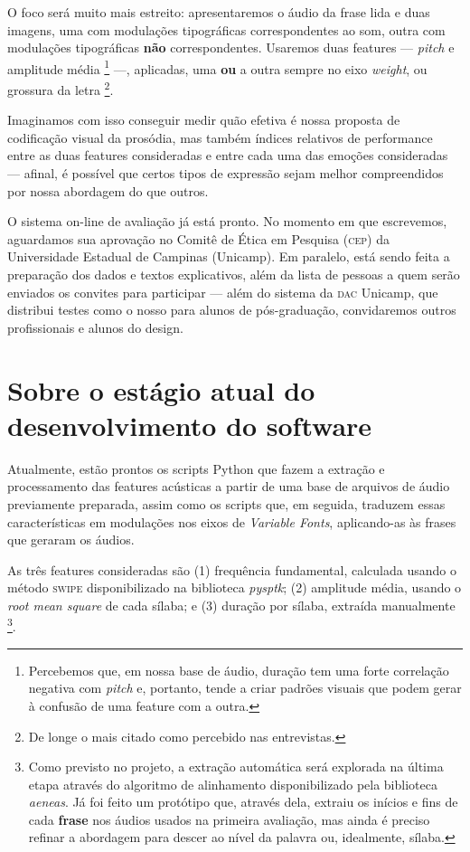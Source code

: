 \documentclass[a4paper,11pt,titlepage,singlespacing]{article}
\let\svthefootnote\thefootnote
\newcommand\Cfootnote[2][black]{\def\thefootnote{\color{#1}\svthefootnote}%
  \footnote{\color{#1}#2}}
\begin{document}
{    O foco será muito mais estreito: apresentaremos o áudio da frase lida e duas imagens, uma com modulações tipográficas correspondentes ao som, outra com modulações tipográficas \textbf{não} correspondentes. Usaremos duas features — \textit{pitch} e amplitude média\Cfootnote[pos_parecer]{Percebemos que, em nossa base de áudio, duração tem uma forte correlação negativa com \textit{pitch} e, portanto, tende a criar padrões visuais que podem gerar à confusão de uma feature com a outra.} —, aplicadas, uma \textbf{ou} a outra sempre no eixo \textit{weight}, ou grossura da letra\Cfootnote[pos_parecer]{De longe o mais citado como percebido nas entrevistas.}. 
    
    Imaginamos com isso conseguir medir quão efetiva é nossa proposta de codificação visual da prosódia, mas também índices relativos de performance entre as duas features consideradas e entre cada uma das emoções consideradas — afinal, é possível que certos tipos de expressão sejam melhor compreendidos por nossa abordagem do que outros.
    
    O sistema on-line de avaliação já está pronto. No momento em que escrevemos, aguardamos sua aprovação no Comitê de Ética em Pesquisa (\textsc{cep}) da Universidade Estadual de Campinas (Unicamp). Em paralelo, está sendo feita a preparação dos dados e textos explicativos, além da lista de pessoas a quem serão enviados os convites para participar — além do sistema da \textsc{dac} Unicamp, que distribui testes como o nosso para alunos de pós-graduação, convidaremos outros profissionais e alunos do design.



    \section{Sobre o estágio atual do desenvolvimento do software}
    
    Atualmente, estão prontos os scripts Python que fazem a extração e processamento das features acústicas a partir de uma base de arquivos de áudio previamente preparada, assim como os scripts que, em seguida, traduzem essas características em modulações nos eixos de \textit{Variable Fonts}, aplicando-as às frases que geraram os áudios.
    
    As três features consideradas são (1) frequência fundamental, calculada usando o método \textsc{swipe} disponibilizado na biblioteca \textit{pysptk}; (2) amplitude média, usando o \textit{root mean square} de cada sílaba; e (3) duração por sílaba, extraída manualmente\Cfootnote[pos_parecer]{Como previsto no projeto, a extração automática será explorada na última etapa através do algoritmo de alinhamento disponibilizado pela biblioteca \textit{aeneas}. Já foi feito um protótipo que, através dela, extraiu os inícios e fins de cada \textbf{frase} nos áudios usados na primeira avaliação, mas ainda é preciso refinar a abordagem para descer ao nível da palavra ou, idealmente, sílaba.}.
    
}
\end{document}
